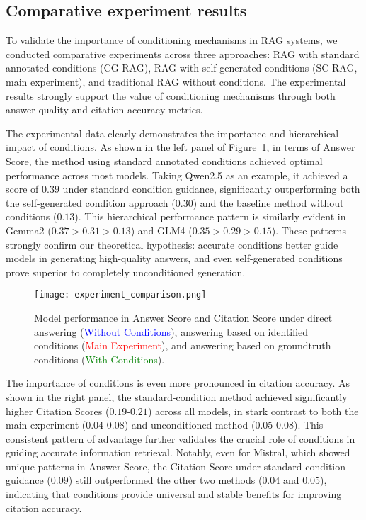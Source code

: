 \subsection{Comparative experiment results}


%


To validate the importance of conditioning mechanisms in RAG systems, we conducted comparative experiments across three approaches: RAG with standard annotated conditions (CG-RAG), RAG with self-generated conditions (SC-RAG, main experiment), and traditional RAG without conditions. The experimental results strongly support the value of conditioning mechanisms through both answer quality and citation accuracy metrics.

The experimental data clearly demonstrates the importance and hierarchical impact of conditions. As shown in the left panel of Figure~\ref{fig:answer-score-comparison}, in terms of Answer Score, the method using standard annotated conditions achieved optimal performance across most models. Taking Qwen2.5 as an example, it achieved a score of $0.39$ under standard condition guidance, significantly outperforming both the self-generated condition approach ($0.30$) and the baseline method without conditions ($0.13$). This hierarchical performance pattern is similarly evident in Gemma2 ($0.37>0.31>0.13$) and GLM4 ($0.35>0.29>0.15$). These patterns strongly confirm our theoretical hypothesis: accurate conditions better guide models in generating high-quality answers, and even self-generated conditions prove superior to completely unconditioned generation.

\begin{figure}[h]
\centering
\texttt{[image: experiment\_comparison.png]}
\caption{Model performance in Answer Score and Citation Score under direct answering (\textcolor{blue}{Without Conditions}), answering based on identified conditions (\textcolor{red}{Main Experiment}), and answering based on groundtruth conditions (\textcolor{green}{With Conditions}).}
\label{fig:answer-score-comparison}
\end{figure}

The importance of conditions is even more pronounced in citation accuracy. As shown in the right panel, the standard-condition method achieved significantly higher Citation Scores ($0.19$-$0.21$) across all models, in stark contrast to both the main experiment ($0.04$-$0.08$) and unconditioned method ($0.05$-$0.08$). This consistent pattern of advantage further validates the crucial role of conditions in guiding accurate information retrieval. Notably, even for Mistral, which showed unique patterns in Answer Score, the Citation Score under standard condition guidance ($0.09$) still outperformed the other two methods ($0.04$ and $0.05$), indicating that conditions provide universal and stable benefits for improving citation accuracy.

